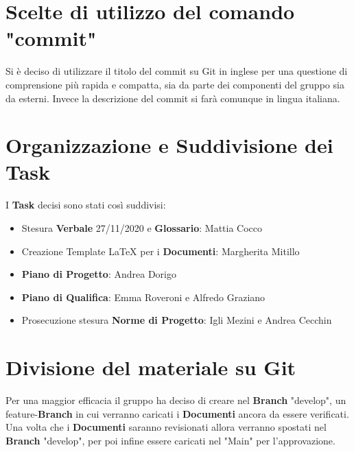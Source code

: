 \documentclass[a4paper,12pt]{report}
\begin{document}
	\chapter{Scelte di utilizzo del comando "commit"}
	Si è deciso di utilizzare il titolo del commit su Git in inglese per una questione di comprensione più rapida e compatta, sia da parte dei componenti del gruppo sia da esterni.
	Invece la descrizione del commit si farà comunque in lingua italiana.
	
	\chapter{Organizzazione e Suddivisione dei Task}
	I \textbf{Task} decisi sono stati così suddivisi:
	\begin{itemize}
		\item Stesura \textbf{Verbale} 27/11/2020 e \textbf{Glossario}: Mattia Cocco
		\item Creazione Template LaTeX per i \textbf{Documenti}: Margherita Mitillo
		\item \textbf{Piano di Progetto}: Andrea Dorigo
		\item \textbf{Piano di Qualifica}: Emma Roveroni e Alfredo Graziano
		\item Prosecuzione stesura \textbf{Norme di Progetto}: Igli Mezini e Andrea Cecchin		
	\end{itemize}
	
	\chapter{Divisione del materiale su Git}
	Per una maggior efficacia il gruppo ha deciso di creare nel \textbf{Branch} "develop", un feature-\textbf{Branch} in cui verranno caricati i \textbf{Documenti}
	ancora da essere verificati. 
	Una volta che i \textbf{Documenti} saranno revisionati allora verranno spostati nel \textbf{Branch} "develop", per poi infine essere caricati nel "Main" per l'approvazione.
	
	
	
	
\end{document}
